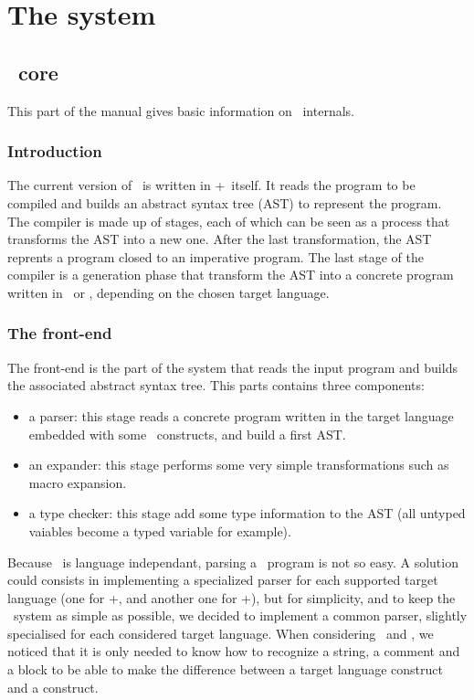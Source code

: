 \part{The system}
\chapter{\TOM\ core}
This part of the manual gives basic information on \TOM\ internals.


\section{Introduction}
The current version of \TOM\ is written in
\Java+\TOM\ itself. 
It reads the program to be compiled and builds an abstract syntax tree
(AST) to represent the program.
The compiler is made up of stages, each of which can be seen as a
process that transforms the AST into a new one. After the last transformation,
the AST reprents a program closed to an imperative program.
The last stage of the compiler is a generation phase that transform
the AST into a concrete program written in \Clang\ or \Java, depending 
on the chosen target language.


\section{The front-end}
The front-end is the part of the system that reads the input program
and builds the associated abstract syntax tree.
This parts contains three components:
\begin{itemize}
\item a parser: this stage reads a concrete program written in the
  target language embedded with some \TOM\ constructs, and build a
  first AST.
\item an expander: this stage performs some very simple
  transformations such as macro expansion.
\item a type checker: this stage add some type information to the AST
  (all untyped vaiables become a typed variable for example).
\end{itemize}

Because \TOM\ is language independant, parsing a \TOM\ program is not
so easy. A solution could consists in implementing a specialized
parser for each supported target language (one for \Clang+\TOM, and
another one for \Java+\TOM), but for simplicity, and to keep the \TOM\
system as simple as possible, we decided to implement a common parser,
slightly specialised for each considered target language. 
When considering \Clang\ and \Java, we noticed that it is only needed to
know how to recognize a string, a comment and a block to be able to
make the difference between a target language construct and a \TOM
construct.

